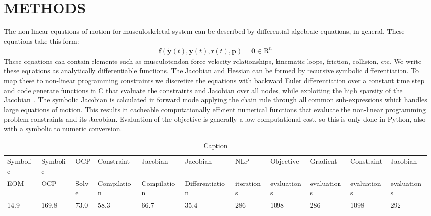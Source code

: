 \documentclass[11pt,twocolumn]{article}
\begin{document}
\section*{METHODS}
%
The non-linear equations of motion for musculoskeletal system can be described
by differential algebraic equations, in general. These equations take this
form:
%
\begin{align}
  \mathbf{f}(\dot{\mathbf{y}}(t), \mathbf{y}(t), \mathbf{r}(t), \mathbf{p}) =
  \mathbf{0} \in \mathrm{R}^n
\end{align}
%
These equations can contain elements such as musculotendon force-velocity
relationships, kinematic loops, friction, collision, etc. We write these
equations as analytically differentiable functions. The Jacobian and Hessian can
be formed by recursive symbolic differentiation. To map these to non-linear
programming constraints we discretize the equations with backward Euler
differentiation over a constant time step and code generate functions in C that
evaluate the constraints and Jacobian over all nodes, while exploiting the high
sparsity of the Jacobian~\cite{Moore2018}. The symbolic Jacobian is calculated
in forward mode applying the chain rule through all common sub-expressions which
handles large equations of motion. This results in cacheable computationally
efficient numerical functions that evaluate the non-linear programming problem
constraints and its Jacobian. Evaluation of the objective is generally a low
computational cost, so this is only done in Python, also with a symbolic to
numeric conversion.
%
\begin{table*}[t]
    \centering
    \tiny
    \begin{tabular}{lllllllllll}
    Symbolic&Symbolic&OCP&Constraint&Jacobian
    &Jacobian&NLP&Objective&
    Gradient&Constraint&Jacobian
         \\
    EOM&OCP&Solve&Compilation&
    Compilation&Differentiation&iterations&evaluations&
    evaluations&evaluations&evaluations
         \\
         14.9&169.8&73.0&58.3&66.7&35.4&286&1098&286&1098&292
    \end{tabular}
    \caption{Caption}
    \label{tab:my_label}
\end{table*}
\end{document}
